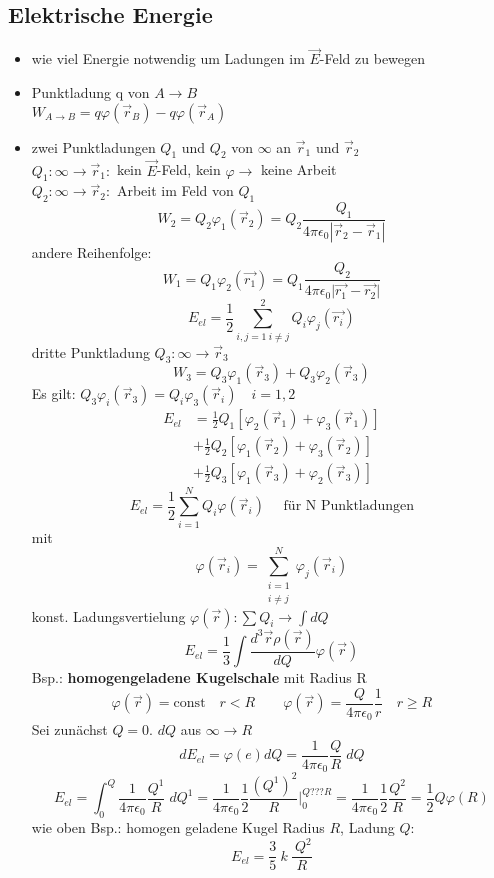 \documentclass[titlepage,12pt,a4paper,ngerman]{report}
\newcommand{\tx}[1]{\textrm{#1}}
\begin{document}
\subsection{Elektrische Energie}
\begin{itemize}
\item wie viel Energie notwendig um Ladungen im $\vec{E}$-Feld zu bewegen
\item Punktladung q von $A \rightarrow B$\\
$ W_{A\rightarrow B}= q \varphi(\vec{r}_B) - q \varphi(\vec{r}_A)$
\item zwei Punktladungen $Q_1$ und $Q_2$ von $\infty$ an $\vec{r}_1$ und $\vec{r}_2$\\
$Q_1: \infty \rightarrow \vec{r}_1:$ kein $\vec{E}$-Feld, kein $\varphi \rightarrow$ keine Arbeit\\
$Q_2: \infty \rightarrow \vec{r}_2:$ Arbeit im Feld von $Q_1$\\
$$W_2 = Q_2 \varphi_1(\vec{r}_2) = Q_2 \frac{Q_1}{4\pi\epsilon_0 |\vec{r}_2 - \vec{r}_1|}$$ 
andere Reihenfolge: $$W_1 = Q_1 \varphi_2 (\vec{r_1}) = Q_1 \frac{Q_2}{4 \pi \epsilon_0  \vert \vec{r_1} - \vec{r_2}\vert }$$
$$E_{el} = \frac{1}{2} \sum_{i,j=1 \ i\neq j}^{2}Q_i \varphi_j(\vec{r_i})$$
dritte Punktladung $Q_3 : \infty \rightarrow \vec{r}_3$\\
$$W_3 = Q_3 \varphi_1(\vec{r}_3) + Q_3 \varphi_2(\vec{r}_3)$$
Es gilt: $Q_3 \varphi_i(\vec{r}_3) = Q_i \varphi_3(\vec{r}_i) \quad i = 1,2$
\begin{align*}
E_{el} &= \frac{1}{2} Q_1 [\varphi_2(\vec{r}_1) + \varphi_3(\vec{r}_1)] \\
& + \frac{1}{2} Q_2 [\varphi_1(\vec{r}_2) + \varphi_3(\vec{r}_2)] \\
& + \frac{1}{2} Q_3 [\varphi_1(\vec{r}_3) + \varphi_2(\vec{r}_3)]
\end{align*}
$$E_{el} = \frac{1}{2} \sum_{i=1}^N Q_i \varphi(\vec{r}_i) \quad \tx{ für N Punktladungen}$$
mit $$\varphi(\vec{r}_i) = \sum^N_{\substack{ i=1 \\ i \neq j }} \varphi_j(\vec{r}_i)$$
konst. Ladungsvertielung $\varphi(\vec{r}) : \sum Q_i \rightarrow \int dQ$
$$E_{el}= \frac{1}{3} \int \frac{d^3\vec{r} \rho (\vec{r})}{dQ} \varphi(\vec{r})$$
Bsp.: \textbf{homogengeladene Kugelschale} mit Radius R
$$\varphi(\vec{r}) = \tx{const} \quad  r<R \qquad \varphi(\vec{r})= \frac{Q}{4\pi\epsilon_0} \frac{1}{r} \quad r\ge R$$
Sei zunächst $Q = 0$. $dQ$ aus $\infty \rightarrow R$\\
$$dE_{el}= \varphi(e) dQ = \frac{1}{4\pi\epsilon_0} \frac{Q}{R} \; dQ$$
$$E_{el}= \int^Q_0 \frac{1}{4\pi\epsilon_0} \frac{Q^1}{R} \; dQ^1 = \frac{1}{4\pi\epsilon_0} \frac{1}{2} \frac{(Q^{1})^2}{R} \bigg\vert_0^{Q???R} = \frac{1}{4\pi\epsilon_0} \frac{1}{2} \frac{Q^2}{R} = \frac{1}{2} Q \varphi(R)$$ wie oben
Bsp.: homogen geladene Kugel Radius $R$, Ladung $Q$:
$$E_{el} = \frac{3}{5}\ k\ \frac{\ Q^2}{R}$$
\end{itemize}
\end{document}
